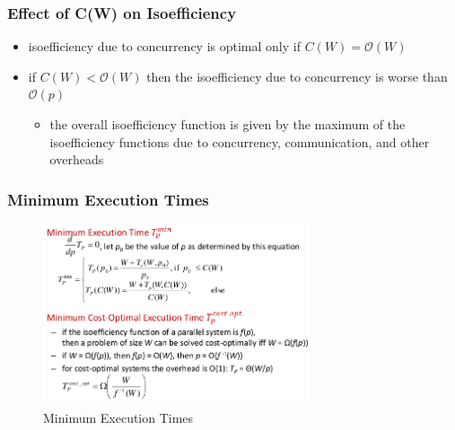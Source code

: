 \hypertarget{effect-of-cw-on-isoefficiency}{%
\subsubsection{Effect of C(W) on
Isoefficiency}\label{effect-of-cw-on-isoefficiency}}

\begin{itemize}
\tightlist
\item
  isoefficiency due to concurrency is optimal only if $C(W) = \mathcal{O}(W)$
\item
  if $C(W) < \mathcal{O}(W)$ then the isoefficiency due to concurrency is
  worse than $\mathcal{O}(p)$

  \begin{itemize}
  \tightlist
  \item
    the overall isoefficiency function is given by the maximum of the
    isoefficiency functions due to concurrency, communication, and other
    overheads
  \end{itemize}
\end{itemize}

\hypertarget{minimum-execution-times}{%
\subsubsection{Minimum Execution Times}\label{minimum-execution-times}}

\begin{figure}[H]
\centering
\includegraphics[width=0.7\textwidth]{figures/minimum-execution-time.png}
\caption{Minimum Execution Times}
\end{figure}

\clearpage
